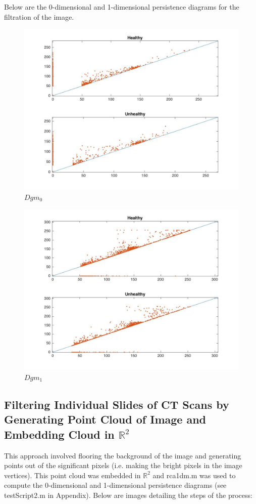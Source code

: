 \documentclass[12pt]{report}
\begin{document}
Below are the 0-dimensional and 1-dimensional persistence diagrams for the filtration of the image.
\begin{figure}[H]
\centering
	\includegraphics[width=0.8\linewidth]{0dimpersTs.jpg}
	\caption{$Dgm_0$}
\end{figure}


\begin{figure}[H]
\centering
	\includegraphics[width=0.8\linewidth]{1dimpersTS.jpg}
	\caption{$Dgm_1$}
\end{figure}



\subsection{Filtering Individual Slides of CT Scans by Generating Point Cloud of Image and Embedding Cloud in $\mathbb{R}^2$}

This approach involved flooring the background of the image and generating points out of the significant pixels (i.e. making the bright pixels in the image vertices). This point cloud was embedded in $\mathbb{R}^2$ and rca1dm.m was used to compute the 0-dimensional and 1-dimensional persistence diagrams (see testScript2.m in Appendix). Below are images detailing the steps of the process: \newline
\end{document}
